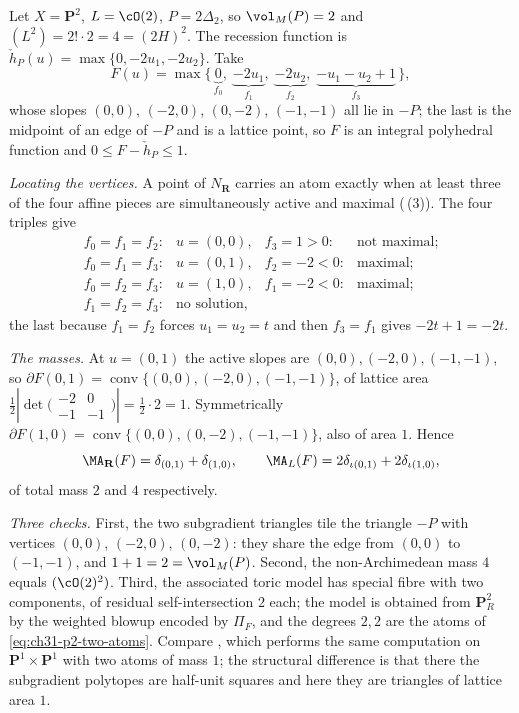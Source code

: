 \begin{example}
\label{ex:ch31-toric-p2-two-atoms}
Let \(X=\mathbf P^2\), \(L=\cO(2)\), \(P=2\Delta_2\), so
\(\vol_M(P)=2\) and \((L^2)=2!\cdot2=4=(2H)^2\).  The recession function is
\(\check h_P(u)=\max\{0,-2u_1,-2u_2\}\).  Take
\[
 F(u)=\max\{\,\underbrace{0}_{f_0},\;
             \underbrace{-2u_1}_{f_1},\;
             \underbrace{-2u_2}_{f_2},\;
             \underbrace{-u_1-u_2+1}_{f_3}\,\},
\]
whose slopes \((0,0)\), \((-2,0)\), \((0,-2)\), \((-1,-1)\) all lie in
\(-P\); the last is the midpoint of an edge of \(-P\) and is a lattice
point, so \(F\) is an integral polyhedral function and
\(0\leq F-\check h_P\leq1\).

\emph{Locating the vertices.}  A point of \(N_\mathbf R\) carries an atom
exactly when at least three of the four affine pieces are simultaneously
active and maximal (\,(3)).  The four
triples give
\[
 \begin{array}{llll}
 f_0=f_1=f_2:&u=(0,0),&f_3=1>0:&\text{not maximal};\\
 f_0=f_1=f_3:&u=(0,1),&f_2=-2<0:&\text{maximal};\\
 f_0=f_2=f_3:&u=(1,0),&f_1=-2<0:&\text{maximal};\\
 f_1=f_2=f_3:&\text{no solution},&&
 \end{array}
\]
the last because \(f_1=f_2\) forces \(u_1=u_2=t\) and then \(f_3=f_1\)
gives \(-2t+1=-2t\).

\emph{The masses.}  At \(u=(0,1)\) the active slopes are
\((0,0),(-2,0),(-1,-1)\), so
\(\partial F(0,1)=\operatorname{conv}\{(0,0),(-2,0),(-1,-1)\}\), of lattice
area \(\tfrac12|{\det}\bigl(\begin{smallmatrix}-2&0\\-1&-1\end{smallmatrix}\bigr)|
 =\tfrac12\cdot2=1\).  Symmetrically
\(\partial F(1,0)=\operatorname{conv}\{(0,0),(0,-2),(-1,-1)\}\), also of
area \(1\).  Hence
\begin{equation}
\label{eq:ch31-p2-two-atoms}
 \MA_{\mathbf R}(F)=\delta_{(0,1)}+\delta_{(1,0)},
 \qquad
 \MA_L(F)=2\delta_{\iota(0,1)}+2\delta_{\iota(1,0)},
\end{equation}
of total mass \(2\) and \(4\) respectively.

\emph{Three checks.}  First, the two subgradient triangles tile the triangle
\(-P\) with vertices \((0,0)\), \((-2,0)\), \((0,-2)\): they share the edge
from \((0,0)\) to \((-1,-1)\), and \(1+1=2=\vol_M(P)\).  Second, the
non-Archimedean mass \(4\) equals \((\cO(2)^2)\).  Third, the associated
toric model has special fibre with two components, of residual
self-intersection \(2\) each; the model is obtained from
\(\mathbf P^2_R\) by the weighted blowup encoded by \(\Pi_F\), and the
degrees \(2,2\) are the atoms of \eqref{eq:ch31-p2-two-atoms}.  Compare
, which performs the same computation on
\(\mathbf P^1\times\mathbf P^1\) with two atoms of mass \(1\); the
structural difference is that there the subgradient polytopes are half-unit
squares and here they are triangles of lattice area \(1\).
\end{example}

